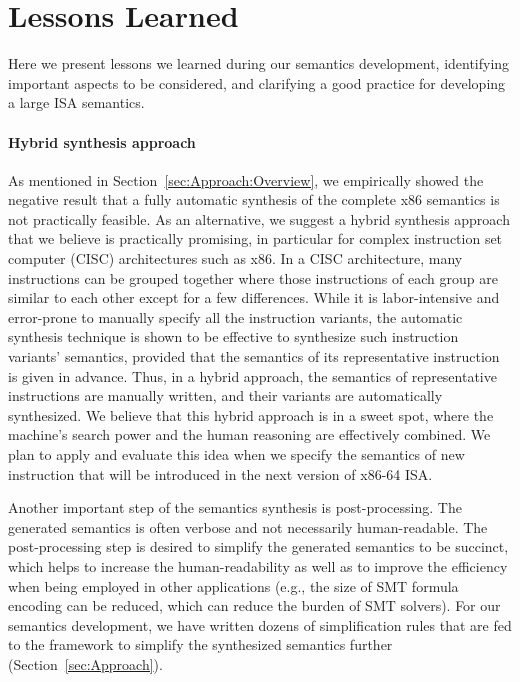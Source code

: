 \section{Lessons Learned}
\label{sec:lesson-learned}

Here we present lessons we learned during our semantics development, identifying important aspects to be considered, and clarifying a good practice for developing a large ISA semantics.

\paragraph{Hybrid synthesis approach}

As mentioned in Section~\ref{sec:Approach:Overview}, we empirically showed the negative result that a fully automatic synthesis of the complete x86 semantics is not practically feasible. As an alternative, we suggest a hybrid synthesis approach that we believe is practically promising, in particular for complex instruction set computer (CISC) architectures such as x86. In a CISC architecture, many instructions can be grouped together where those instructions of each group are similar to each other except for a few differences. While it is labor-intensive and error-prone to manually specify all the instruction variants, the automatic synthesis technique is shown to be effective to synthesize such instruction variants' semantics, provided that the semantics of its representative instruction is given in advance. Thus, in a hybrid approach, the semantics of representative instructions are manually written, and their variants are automatically synthesized. We believe that this hybrid approach is in a sweet spot, where the machine's search power and the human reasoning are effectively combined. We plan to apply and evaluate this idea when we specify the semantics of new instruction that will be introduced in the next version of x86-64 ISA.

Another important step of the semantics synthesis is post-processing. The generated semantics is often verbose and not necessarily human-readable. The post-processing step is desired to simplify the generated semantics to be succinct, which helps to increase the human-readability as well as to improve the efficiency when being employed in other applications (e.g., the size of SMT formula encoding can be reduced, which can reduce the burden of SMT solvers). For our semantics development, we have written dozens of simplification rules that are fed to the \K framework to simplify the synthesized semantics further (Section~\ref{sec:Approach}).

